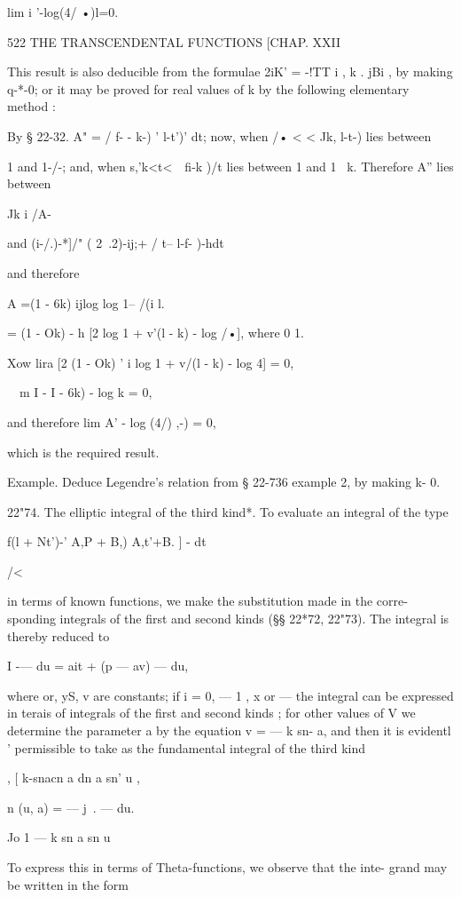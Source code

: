 lim i '-log(4/ •)l=0.

522 THE TRANSCENDENTAL FUNCTIONS [CHAP. XXII

This result is also deducible from the formulae 2iK' = -!TT i , k .
jBi , by making q-*-0; or it may be proved for real values of k by the
following elementary method :

By § 22-32. A" = / f- - k-) ' l-t')' dt; now, when /• < < Jk, l-t-)
lies between

1 and 1-/-; and, when s,'k<t<\ \ fi-k )/t lies between 1 and 1 ~k.
Therefore A'' lies between

Jk i /A-

and (i-/.)-*]/" ( 2\ .2)-ij;+ / t-- l-f- )-hdt\;

and therefore

A =(1 - 6k) ijlog log 1-- /(i l.

= (1 - Ok) - h [2 log 1 + v'(l - k) - log /•], where 0 1.

Xow lira [2 (1 - Ok) ' i log 1 + v/(l - k) - log 4] = 0,

\ \ m I - I - 6k) - log k = 0,

and therefore lim A' - log (4/) ,-) = 0,

which is the required result.

Example. Deduce Legendre's relation from § 22-736 example 2, by making
k- 0.

22"74. The elliptic integral of the third kind*. To evaluate an
integral of the type

f(l + Nt')-' A,P + B,) A,t'+B. ] - dt

/<

in terms of known functions, we make the substitution made in the
corre- sponding integrals of the first and second kinds (§§ 22*72,
22"73). The integral is thereby reduced to

I -— du = ait + (p — av) — du,

where or, yS, v are constants; if i = 0, — 1 , x or — the integral
can be expressed in terais of integrals of the first and second kinds
; for other values of V we determine the parameter a by the equation v
= — k sn- a, and then it is evidentl ' permissible to take as the
fundamental integral of the third kind

  , [ k-snacn a dn a sn' u ,

n (u, a) = — j~. — du.

  Jo 1 — k sn a sn u

To express this in terms of Theta-functions, we observe that the inte-
grand may be written in the form

